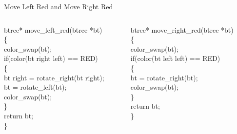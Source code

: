 \documentclass{beamer}
\begin{document}
\begin{frame}{Move Left Red and Move Right Red}
\begin{columns}
\begin{column}{0.5\textwidth}
   \justifying
   btree* move\_left\_red(btree *bt)\\
\{\\
    color\_swap(bt);\\
    if(color(bt \rightarrow right \rightarrow left) == RED)\\
    \{\\
        bt \rightarrow right = rotate\_right(bt \rightarrow right);\\
        bt = rotate\_left(bt);\\
        color\_swap(bt);\\
    \}\\ return bt;\\
\}
\end{column}
\begin{column}{0.5\textwidth}
    \justifying
    btree* move\_right\_red(btree *bt)\\
\{\\
    color\_swap(bt);\\
    if(color(bt \rightarrow left \rightarrow left) == RED)\\
    \{\\
        bt = rotate\_right(bt);\\
        color\_swap(bt);\\
    \}\\ return bt;\\
\}
\end{column}
\end{columns}
\end{frame}
\end{document}
